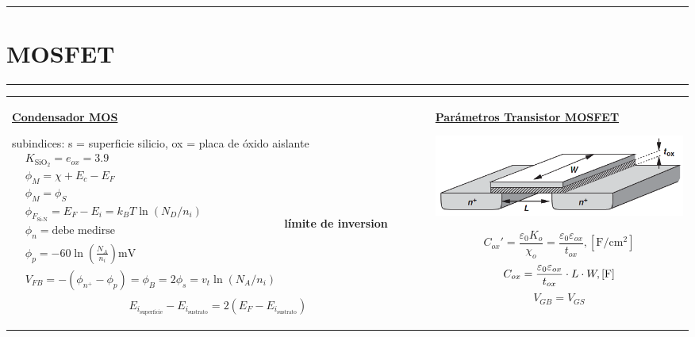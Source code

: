 \documentclass[../main.tex]{subfiles}
\begin{document}
\everymath{\displaystyle}
\vspace{0.2in}
\hrule
\vspace{0.1in}
\section{MOSFET}
\hrule
\begin{xltabular}{\textwidth}{|X|X|}
	\hline
	\endhead
	\hline
	\endfoot
	\endlastfoot
	\underline{\textbf{Condensador MOS}}

	subindices: s = superficie silicio, ox = placa de óxido aislante
	\newline\newline
	$\begin{aligned}
			 & K_{\text{SiO}_2} = e_{ox} = 3.9                                      \\
			 & \phi_M =\chi +E_c - E_F                                              \\
			 & \phi_M =\phi_S                                                       \\
			 & \phi_{F_\text{Si-N}} = E_F - E_i = k_BT\ln(N_D/n_i)                  \\
			 & \phi_n = \text{debe medirse}                                         \\
			 & \phi_p = -60\ln(\frac{N_A}{n_i})\si{\mV}                             \\
			 & V_{FB} = - (\phi_{n^+} - \phi_p) =\phi_B = 2\phi_s = v_t\ln(N_A/n_i) \\
		\end{aligned}$
	\newline
	\textbf{límite de inversion}
	$$E_{i_\text{superficie}} - E_{i_\text{sustrato}} = 2(E_F - E_{i_\text{sustrato}})$$
	&
	\underline{\textbf{Parámetros Transistor MOSFET}}
	\begin{center}\includegraphics[scale=0.5]{assets/mosfet}\end{center}
	$$C_{ox}' = \frac{\varepsilon_0K_o}{\chi_o} = \frac{\varepsilon_0\varepsilon_{ox}}{t_{ox}}, [\si{\F\per\square\cm}]$$
	$$C_{ox} = \frac{\varepsilon_0 \varepsilon_{ox}}{t_{ox}}\cdot L\cdot W, \text{[\si{\F}]}$$
	$$V_{GB} = V_{GS}$$


\end{xltabular}
\end{document}
